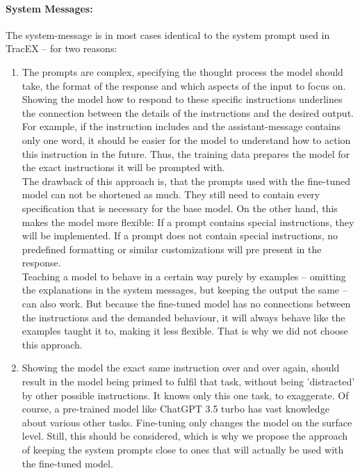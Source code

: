 \paragraph{System Messages:} The system-message is in most cases identical to the system prompt used in TracEX – for two reasons:
\begin{enumerate}
    \item
        The prompts are complex, specifying the thought process the model should take, the format of the response and which aspects of the input to focus on. Showing the model how to respond to these specific instructions underlines the connection between the details of the instructions and the desired output. For example, if the instruction includes  and the assistant-message contains only one word, it should be easier for the model to understand how to action this instruction in the future. Thus, the training data prepares the model for the exact instructions it will be prompted with.\\
        The drawback of this approach is, that the prompts used with the fine-tuned model can not be shortened as much. They still need to contain every specification that is necessary for the base model. On the other hand, this makes the model more flexible: If a prompt contains special instructions, they will be implemented. If a prompt does not contain special instructions, no predefined formatting or similar customizations will pre present in the response.\\
        Teaching a model to behave in a certain way purely by examples – omitting the explanations in the system messages, but keeping the output the same – can also work. But because the fine-tuned model has no connections between the instructions and the demanded behaviour, it will always behave like the examples taught it to, making it less flexible. That is why we did not choose this approach.
    \item 
        Showing the model the exact same instruction over and over again, should result in the model being primed to fulfil that task, without being 'distracted' by other possible instructions. It knows only this one task, to exaggerate. Of course, a pre-trained model like ChatGPT 3.5 turbo has vast knowledge about various other tasks. Fine-tuning only changes the model on the surface level. Still, this should be considered, which is why we propose the approach of keeping the system prompts close to ones that will actually be used with the fine-tuned model.
\end{enumerate}

